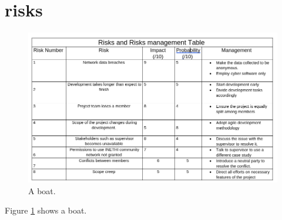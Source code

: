\section{risks}




	
	\begin{figure}
		\includegraphics[width=\linewidth]{risks.png}
		\caption{A boat.}
		\label{fig:boat1}
	\end{figure}
	
	Figure \ref{fig:boat1} shows a boat.
